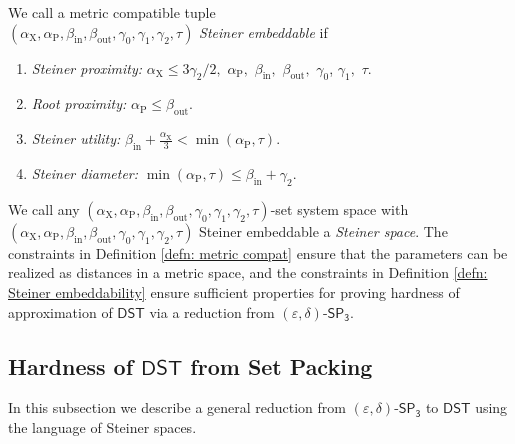 \documentclass{article}\providecommand{\DeclareRedundantLanguages}[2]{}\usepackage[a4paper,margin=20mm]{geometry}
\newcommand{\1}{\textbf{1}}
\newcommand{\setpT}{$\mathsf{SP_3}$\xspace}
\newcommand{\dst}{$\mathsf{DST}$\xspace}
\newcommand{\td}{\tau}
\newcommand{\srd}{\alpha_{\text{X}}}
\newcommand{\trd}{\alpha_{\text{P}}}
\begin{document}
\begin{definition} \label{defn: Steiner embeddability}
We call a metric compatible tuple \\ $(\srd, \trd, \beta_{\text{in}}, \beta_{\text{out}}, \gamma_0, \gamma_1, \gamma_2, \td)$ \textit{Steiner embeddable} if 
\begin{enumerate}[label=(P\arabic*)]
\item \textit{Steiner proximity:} $\srd \leq 3\gamma_2/2,$ $\trd,$ $\beta_{\text{in}},$ $\beta_{\text{out}},$ $\gamma_0$, $\gamma_1,$ $\td$. \label{cond: sr prox}
    \item \textit{Root proximity:} $\trd \leq \beta_{\text{out}}.$  \label{cond: res s adj}
    \item \textit{Steiner utility:} $\beta_{\text{in}} + \frac{\srd}{3} < \min(\trd, \td)$.  \label{cond: s util}
    \item \textit{Steiner diameter:} $\min(\trd, \td) \leq \beta_{\text{in}} + \gamma_2$.  \label{cond: ss' non adj}
\end{enumerate}


We call any $(\srd, \trd, \beta_{\text{in}}, \beta_{\text{out}}, \gamma_0, \gamma_1, \gamma_2, \td)$-set system space with $(\srd, \trd, \beta_{\text{in}}, \beta_{\text{out}}, \gamma_0, \gamma_1, \gamma_2, \td)$ Steiner embeddable a \textit{Steiner space}.  The constraints in Definition \ref{defn: metric compat} ensure that the parameters can be realized as distances in a metric space, and the constraints in Definition \ref{defn: Steiner embeddability} ensure sufficient properties for proving hardness of approximation of \dst via a reduction from $(\varepsilon, \delta)$-\setpT.
\end{definition}





\subsection{Hardness of \texorpdfstring{\dst}{DST} from Set Packing} \label{subsec: gap preserving red metric st}

 In this subsection we describe a general reduction from $(\varepsilon,\delta)$-\setpT to \dst using the language of Steiner spaces.
\end{document}
